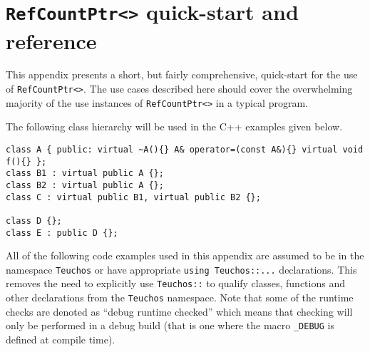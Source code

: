 \documentclass[pdf,ps2pdf,11pt]{SANDreport}
\begin{document}
%
\section{\texttt{RefCountPtr<>} quick-start and reference}
\label{rcpqs:apdx:quickstart}
%

This appendix presents a short, but fairly comprehensive, quick-start
for the use of {}\texttt{Ref\-Count\-Ptr<>}.  The use cases described
here should cover the overwhelming majority of the use instances of
{}\texttt{Ref\-Count\-Ptr<>} in a typical program.

The following class hierarchy will be used in the C++ examples given
below.

{\small\begin{verbatim}
class A { public: virtual ~A(){} A& operator=(const A&){} virtual void f(){} };
class B1 : virtual public A {};
class B2 : virtual public A {};
class C : virtual public B1, virtual public B2 {};

class D {};
class E : public D {};
\end{verbatim}}

All of the following code examples used in this appendix are assumed
to be in the namespace {}\texttt{Teuchos} or have appropriate
{}\texttt{using Teuchos::...} declarations.  This removes the need to
explicitly use {}\texttt{Teuchos::} to qualify classes, functions and
other declarations from the {}\texttt{Teuchos} namespace.  Note that
some of the runtime checks are denoted as ``debug runtime checked''
which means that checking will only be performed in a debug build
(that is one where the macro {}\texttt{\_DEBUG} is defined at compile time).
\end{document}
